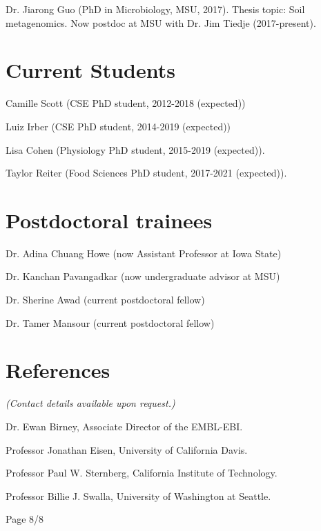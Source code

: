 \documentclass[margin,line]{resume}
\begin{document}
\begin{resume}
Dr. Jiarong Guo (PhD in Microbiology, MSU, 2017). Thesis topic: Soil
metagenomics. Now postdoc at MSU with Dr. Jim Tiedje (2017-present).

\section{\mysidestyle Current Students}

\begin{list1}
\item[] Camille Scott (CSE PhD student, 2012-2018 (expected))
\item[] Luiz Irber (CSE PhD student, 2014-2019 (expected))
\item[] Lisa Cohen (Physiology PhD student, 2015-2019 (expected)).
\item[] Taylor Reiter (Food Sciences PhD student, 2017-2021 (expected)).
\end{list1}


\section{\mysidestyle Postdoctoral trainees}

\begin{list1}
\item[] Dr. Adina Chuang Howe (now Assistant Professor at Iowa State)
\item[] Dr. Kanchan Pavangadkar (now undergraduate advisor at MSU)
\item[] Dr. Sherine Awad (current postdoctoral fellow)
\item[] Dr. Tamer Mansour (current postdoctoral fellow)
\end{list1}

\section{\mysidestyle References}

{\em (Contact details available upon request.)}

Dr. Ewan Birney, Associate Director of the EMBL-EBI.

Professor Jonathan Eisen, University of California Davis.

Professor Paul W. Sternberg, California Institute of Technology.

Professor Billie J. Swalla, University of Washington at Seattle.

\vspace{2cm}
{\centerline {Page 8/8}}

\end{resume}
\end{document}
